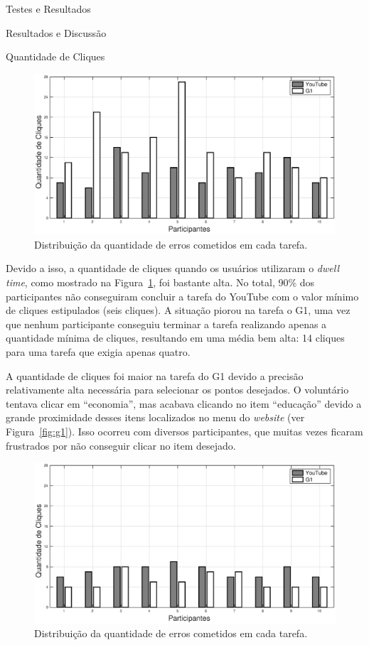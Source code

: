 \begin{chapter}{Testes e Resultados}
\begin{section}{Resultados e Discussão}
\begin{subsection}{Quantidade de Cliques}
\begin{figure}[!h]
	\centering
	\includegraphics[width=1.00\linewidth]{fig/DwellClicks}
	\caption{Distribuição da quantidade de erros cometidos em cada tarefa.}
	\label{fig:dwellclicks}
\end{figure}

Devido a isso, a quantidade de cliques quando os usuários utilizaram o
\textit{dwell time}, como mostrado na Figura~\ref{fig:dwellclicks}, foi bastante
alta. No total, 90\% dos participantes não conseguiram concluir a tarefa do
YouTube com o valor mínimo de cliques estipulados (seis cliques). A situação
piorou na tarefa o G1, uma vez que nenhum participante conseguiu terminar a
tarefa realizando apenas a quantidade mínima de cliques, resultando em uma média 
bem alta: 14 cliques para uma tarefa que exigia apenas quatro.
  
A quantidade de cliques foi maior na tarefa do G1 devido a precisão
relativamente alta necessária para selecionar os pontos desejados. O voluntário
tentava clicar em ``economia'', mas acabava clicando no item ``educação'' devido
a grande proximidade desses itens localizados no menu do \textit{website}
(ver Figura~\ref{fig:g1}). Isso ocorreu com diversos participantes, que muitas
vezes ficaram frustrados por não conseguir clicar no item desejado.

\begin{figure}[!h]
	\centering
	\includegraphics[width=1.00\linewidth]{fig/PuffClicks}
	\caption{Distribuição da quantidade de erros cometidos em cada tarefa.}
	\label{fig:puffclicks}
\end{figure}


\end{subsection}
\end{section}
\end{chapter}
